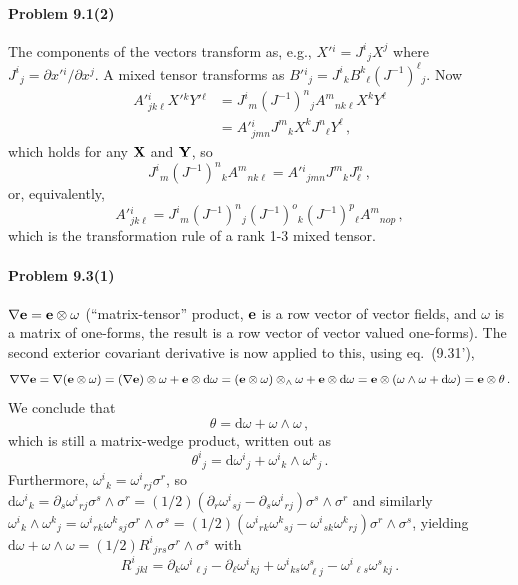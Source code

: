 \documentclass[a4paper,12pt]{article}
\def\d{\mathrm{d}}
\newcommand{\problem}[1]{\paragraph{Problem #1}}
\begin{document}

\problem{9.1(2)} The components of the vectors transform as, e.g.,  $X'{}^i = J^i{}_j X^j$ where $J^i{}_j = \partial x'{}^i/\partial x^j$. A mixed tensor transforms as $B'{}^i{}_j = J^i{}_k B^k{}_\ell (J^{-1})^\ell{}_j$. Now
\[\begin{aligned}
 A'{}^i_{jk\ell}X'{}^k Y'{}^\ell &= J^i{}_m (J^{-1})^n{}_j A^m{}_{nk\ell}X^k Y^\ell\\
 &= A'{}^i_{jm n}J^m{}_k X^k J^n{}_\ell Y^\ell\,,
\end{aligned}\]
which holds for any ${\bf X}$ and ${\bf Y}$, so
\[
 J^i{}_m (J^{-1})^n{}_k A^m{}_{nk\ell} = A'{}^i{}_{jmn} J^m{}_k J^n_\ell\,,
\]
or, equivalently,
\[
 A'{}^i_{jk\ell} = J^i{}_m (J^{-1})^n{}_j (J^{-1})^o{}_k (J^{-1})^p{}_\ell A^m{}_{nop}\,,
\]
which is the transformation rule of a rank 1-3 mixed tensor.


\problem{9.3(1)} $\nabla {\bf e} = {\bf e}\otimes \omega$ (``matrix-tensor'' product, ${\bf e}$ is a row vector of vector fields, and $\omega$ is a matrix of one-forms, the result is a row vector of vector valued one-forms). The second exterior covariant derivative is now applied to this, using eq.\ (9.31'),
\[
 \nabla\nabla {\bf e} = \nabla({\bf e}\otimes \omega) = (\nabla {\bf e})\otimes \omega + {\bf e}\otimes \d \omega = ({\bf e}\otimes \omega)\otimes_\wedge \omega + {\bf e}\otimes \d \omega = {\bf e}\otimes(\omega\wedge \omega + \d \omega) ={\bf e}\otimes \theta\,.
\]
We conclude that
\[
 \theta = \d\omega + \omega \wedge \omega\,,
\]
which is still a matrix-wedge product, written out as
\[
 \theta^i{}_j = \d\omega^i{}_j + \omega^i{}_k \wedge\omega^k{}_j\,.
\]
Furthermore, $\omega^i{}_k = \omega^i{}_{rj}\sigma^r$, so $\d \omega^i{}_k = \partial_s \omega^i{}_{rj}\sigma^s\wedge\sigma^r = (1/2)(\partial_r \omega^i{}_{sj}-\partial_s \omega^i{}_{rj})\sigma^s\wedge\sigma^r$ and similarly $\omega^i{}_k \wedge \omega^k{}_j = \omega^i{}_{rk}\omega^k{}_{sj}\sigma^r\wedge \sigma^s = (1/2) (\omega^i{}_{rk}\omega^k{}_{sj}-\omega^i{}_{sk}\omega^k{}_{rj})\sigma^r\wedge \sigma^s$, yielding $\d\omega + \omega\wedge\omega = (1/2)R^i{}_{jrs}\sigma^r\wedge\sigma^s$ with
\[
 R^i{}_{jkl} = \partial_k\omega^i{}_{\ell j} - \partial_\ell \omega^i{}_{k j} + \omega^i{}_{ks}\omega^s_{\ell j} - \omega^i{}_{\ell s}\omega^s{}_{k j}\,.
\]

\end{document}
